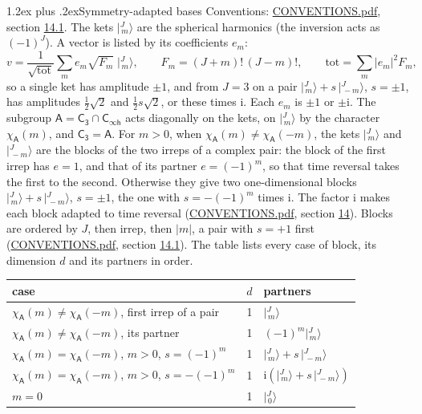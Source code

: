 \documentclass[10pt,a4paper]{article}
\makeatletter
\renewcommand\section{\@startsection{section}{1}{\z@}{-3ex plus -1ex minus -.2ex}%
  {1.2ex plus .2ex}{\normalfont\large\sffamily\bfseries\color{parttitle}}}
\numberwithin{equation}{section}
\newcommand{\grp}[1]{\mathsf{#1}}
\newcommand{\iunit}{\mathrm{i}}
\newcommand{\chiA}{\chi_{\grp{A}}}
\newcommand{\jm}[2]{\bigl\lvert{}^{#1}_{\,#2}\bigr\rangle}
\makeatother
\begin{document}
\section{Symmetry-adapted bases}\label{s:bases}
Conventions: \href{../../CONVENTIONS.pdf}{CONVENTIONS.pdf}, section \href{../../CONVENTIONS.pdf\#conv.14.1}{14.1}.
\leavevmode\label{n:index.m}\label{n:vector.ket}The kets $\jm{J}{m}$ are the spherical harmonics (the inversion acts as $(-1)^J$). \label{n:index.ketcoefficient}\label{n:vector.basis.symmetry}\label{n:index.ketweight}\label{n:index.total}A vector is listed by its coefficients $e_m$:
\begin{equation}\label{e:ket}v = \frac{1}{\sqrt{\mathrm{tot}}}\sum_m e_m\sqrt{F_m}\;\jm{J}{m},\qquad F_m = (J+m)!\,(J-m)!,\qquad \mathrm{tot} = \sum_m |e_m|^2F_m,\end{equation}
\leavevmode\label{n:index.pair.sign}so a single ket has amplitude $\pm1$, and from $J = 3$ on a pair $\jm{J}{m} + s\,\jm{J}{-m}$, $s = \pm1$, has amplitudes $\tfrac{1}{2}\sqrt{2}$ and $\tfrac{1}{2}s\sqrt{2}$, or these times $\iunit$. Each $e_m$ is $\pm1$ or $\pm\iunit$.
\leavevmode\label{n:group.A}\label{n:function.character.abelian}The subgroup $\grp{A} = \grp{C_{3}}\cap\grp{C_{\infty h}}$ acts diagonally on the kets, on $\jm{J}{m}$ by the character $\chiA(m)$, and $\grp{C_{3}} = \grp{A}$. For $m > 0$, when $\chiA(m) \ne \chiA(-m)$, the kets $\jm{J}{m}$ and $\jm{J}{-m}$ are the blocks of the two irreps of a complex pair: the block of the first irrep has $e = 1$, and that of its partner $e = (-1)^m$, so that time reversal takes the first to the second. Otherwise they give two one-dimensional blocks $\jm{J}{m} + s\,\jm{J}{-m}$, $s = \pm1$, the one with $s = -(-1)^m$ times $\iunit$. The factor $\iunit$ makes each block adapted to time reversal (\href{../../CONVENTIONS.pdf}{CONVENTIONS.pdf}, section \href{../../CONVENTIONS.pdf\#conv.14}{14}). Blocks are ordered by $J$, then irrep, then $|m|$, a pair with $s = +1$ first (\href{../../CONVENTIONS.pdf}{CONVENTIONS.pdf}, section \href{../../CONVENTIONS.pdf\#conv.14.1}{14.1}).
\leavevmode\label{n:head.case}\label{n:head.partners}The table lists every case of block, its dimension $d$ and its partners in order.
\begin{center}\begin{tabular}{@{}lrl@{}}\toprule
case & $d$ & partners\\\midrule
$\chiA(m) \ne \chiA(-m)$, first irrep of a pair & 1 & $\jm{J}{m}$\\
$\chiA(m) \ne \chiA(-m)$, its partner & 1 & $(-1)^m\jm{J}{m}$\\
$\chiA(m) = \chiA(-m)$, $m > 0$, $s = (-1)^m$ & 1 & $\jm{J}{m} + s\,\jm{J}{-m}$\\
$\chiA(m) = \chiA(-m)$, $m > 0$, $s = -(-1)^m$ & 1 & $\iunit(\jm{J}{m} + s\,\jm{J}{-m})$\\
$m = 0$ & 1 & $\jm{J}{0}$\\
\bottomrule\end{tabular}\end{center}
\end{document}

